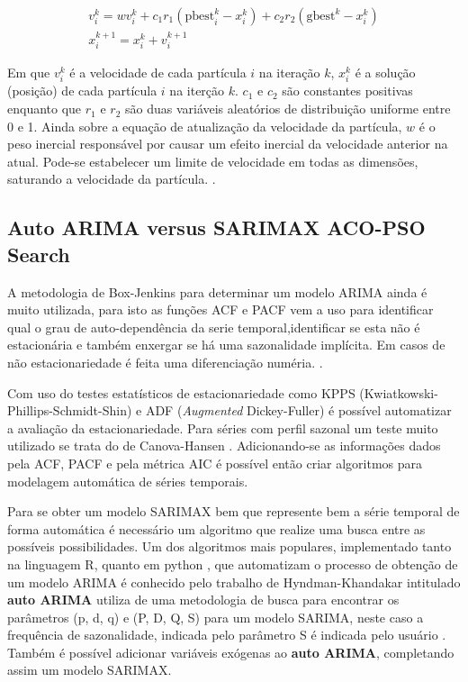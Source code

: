 \begin{equation}
\label{eq:pso_vk}
    \begin{gathered}
        v_i^k=wv_i^k+c_1r_1{(\mathrm{pbest}_i^k-x_i^k)}+c_2r_2{(\mathrm{gbest}^k-x_i^k)} \\
        x_i^{k+1}=x_i^k+v_i^{k+1}
    \end{gathered}
\end{equation}

Em que $v_i^k$ é a velocidade de cada partícula $i$ na iteração $k$, $x_i^{k}$ é a solução (posição) de cada partícula $i$ na iterção $k$. $c_1$ e $c_2$ são constantes positivas enquanto que $r_1$ e $r_2$ são duas variáveis aleatórios de distribuição uniforme entre 0 e 1. Ainda sobre a equação de atualização da velocidade da partícula,  $w$ é o peso inercial responsável por causar um efeito inercial da velocidade anterior na atual. Pode-se estabelecer um limite de velocidade em todas as dimensões, saturando a velocidade da partícula. \cite{jaberipour2011particle}.

\subsection{Auto ARIMA versus SARIMAX ACO-PSO Search}
\label{subsec:autoarima_psoaco}

A metodologia de Box-Jenkins \cite{hipel1977advances} para determinar um modelo ARIMA ainda é muito utilizada, para isto as funções ACF e PACF vem a uso para identificar qual o grau de auto-dependência da serie temporal,identificar se esta não é estacionária e também enxergar se há uma sazonalidade implícita. Em casos de não estacionariedade é feita uma diferenciação numéria. \cite{hipel1977advances,atique2019forecasting, hyndman2020forecasting}.

Com uso do testes estatísticos de estacionariedade como KPPS (Kwiatkowski\hyp{}Phillips\hyp{}Schmidt\hyp{}Shin) \cite{kwiatkowski1992testing} e ADF (\textit{Augmented} Dickey\hyp{}Fuller) \cite{dickey1979distribution} é possível automatizar a avaliação da estacionariedade. Para séries com perfil sazonal um teste muito utilizado se trata do de Canova-Hansen \cite{canova1995seasonal}. Adicionando-se as informações dados pela ACF, PACF e pela métrica AIC é possível então criar algoritmos para modelagem automática de séries temporais.

Para se obter um modelo SARIMAX bem que represente bem a série temporal de forma automática é necessário um algoritmo que realize uma busca entre as possíveis possibilidades. Um dos algoritmos mais populares, implementado tanto na linguagem R, quanto em python \cite{smith2017pmdarima}, que automatizam o processo de obtenção de um modelo ARIMA é conhecido pelo trabalho de Hyndman-Khandakar intitulado \textbf{auto ARIMA} \cite{hyndman2007automatic, hyndman2020forecasting} utiliza de uma metodologia de busca para encontrar os parâmetros (p, d, q) e (P, D, Q, S) para um modelo SARIMA, neste caso a frequência de sazonalidade, indicada pelo parâmetro S é indicada pelo usuário \cite{hyndman2007automatic, smith2017pmdarima}. Também é possível adicionar variáveis exógenas ao \textbf{auto ARIMA}, completando assim um modelo SARIMAX.

